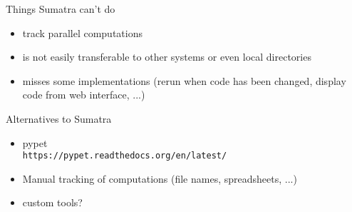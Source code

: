 \begin{frame}[fragile]{}
 \vspace{-0.3cm}
 \Large Things Sumatra can't do
 
 \vspace{0.15cm}
  \large
  \begin{itemize}
    \itemsep6pt
    \item<1->[-] track parallel computations
    \item<2->[-] is not easily transferable to other systems or even
      local directories
    \item<3->[-] misses some implementations (rerun when code has been
      changed, display code from web interface, ...)
  \end{itemize}

\vspace{0.4cm}
\Large Alternatives to Sumatra

\vspace{0.15cm}
  \large
  \begin{itemize}
    \itemsep6pt
    \item<5->[-] pypet\\
      \texttt{https://pypet.readthedocs.org/en/latest/}
    \item<6->[-] Manual tracking of computations (file names,
      spreadsheets, ...)
    \item<7->[-] custom tools?
  \end{itemize}

\end{frame}







